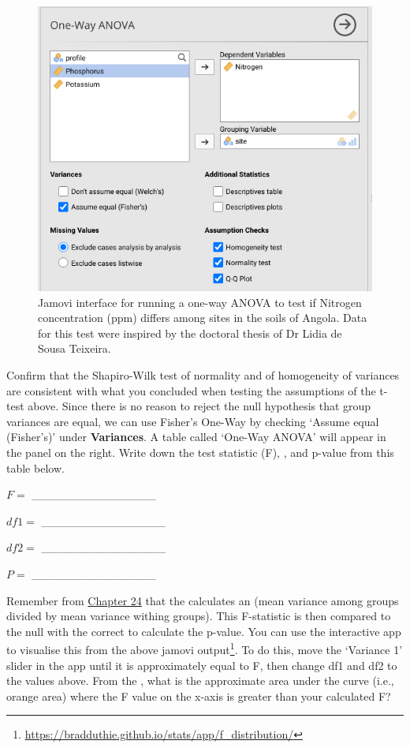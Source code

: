 \documentclass[
  openany]{krantz}
\begin{document}
\begin{figure}
\includegraphics[width=1\linewidth]{img/jamovi_one-way_ANOVA_analysis} \caption{Jamovi interface for running a one-way ANOVA to test if Nitrogen concentration (ppm) differs among sites in the soils of Angola. Data for this test were inspired by the doctoral thesis of Dr Lidia de Sousa Teixeira.}\label{fig:unnamed-chunk-113}
\end{figure}

Confirm that the Shapiro-Wilk test of normality and  of homogeneity of variances are consistent with what you concluded when testing the assumptions of the t-test above.
Since there is no reason to reject the null hypothesis that group variances are equal, we can use Fisher's One-Way  by checking `Assume equal (Fisher's)' under \textbf{Variances}.
A table called `One-Way ANOVA' will appear in the panel on the right.
Write down the test statistic (F), , and p-value from this table below.

\(F =\) \_\_\_\_\_\_\_\_\_\_\_\_\_\_\_

\(df1 =\) \_\_\_\_\_\_\_\_\_\_\_\_\_\_\_

\(df2 =\) \_\_\_\_\_\_\_\_\_\_\_\_\_\_\_

\(P =\) \_\_\_\_\_\_\_\_\_\_\_\_\_\_\_

Remember from \protect\hyperlink{Chapter_24}{Chapter 24} that the  calculates an  (mean variance among groups divided by mean variance withing groups).
This F-statistic is then compared to the null  with the correct  to calculate the p-value.
You can use the interactive app to visualise this from the above jamovi output\footnote{\url{https://bradduthie.github.io/stats/app/f_distribution/}}.
To do this, move the `Variance 1' slider in the app until it is approximately equal to F, then change df1 and df2 to the values above.
From the , what is the approximate area under the curve (i.e., orange area) where the F value on the x-axis is greater than your calculated F?
\end{document}
